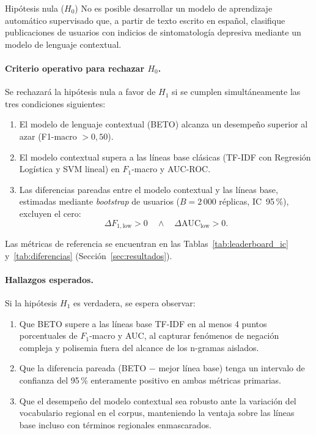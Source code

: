 \documentclass[12pt,a4paper]{article}
\begin{document}
\begin{destacado}{Hipótesis nula ($H_0$)}
No es posible desarrollar un modelo de aprendizaje automático supervisado que, a partir de texto escrito en español, clasifique publicaciones de usuarios con indicios de sintomatología depresiva mediante un modelo de lenguaje contextual.
\end{destacado}

\paragraph{Criterio operativo para rechazar $H_0$.}
Se rechazará la hipótesis nula a favor de $H_1$ si se cumplen simultáneamente las tres condiciones siguientes:
\begin{enumerate}[leftmargin=2em]
    \item El modelo de lenguaje contextual (BETO) alcanza un desempeño superior al azar (F1-macro $> 0{,}50$).
    \item El modelo contextual supera a las líneas base clásicas (TF-IDF con Regresión Logística y SVM lineal) en $F_1$-macro y AUC-ROC.
    \item Las diferencias pareadas entre el modelo contextual y las líneas base, estimadas mediante \emph{bootstrap} de usuarios ($B=2\,000$ réplicas, IC~95\,\%), excluyen el cero:
    \begin{equation}
        \Delta F_{1,\text{low}} > 0 \quad \land \quad \Delta\text{AUC}_{\text{low}} > 0.
    \end{equation}
\end{enumerate}
Las métricas de referencia se encuentran en las Tablas~\ref{tab:leaderboard_ic} y~\ref{tab:diferencias} (Sección~\ref{sec:resultados}).

\paragraph{Hallazgos esperados.}
Si la hipótesis $H_1$ es verdadera, se espera observar:
\begin{enumerate}[leftmargin=2em]
    \item Que BETO supere a las líneas base TF-IDF en al menos 4 puntos porcentuales de $F_1$-macro y AUC, al capturar fenómenos de negación compleja y polisemia fuera del alcance de los n-gramas aislados.
    \item Que la diferencia pareada (BETO $-$ mejor línea base) tenga un intervalo de confianza del 95\,\% enteramente positivo en ambas métricas primarias.
    \item Que el desempeño del modelo contextual sea robusto ante la variación del vocabulario regional en el corpus, manteniendo la ventaja sobre las líneas base incluso con términos regionales enmascarados.
\end{enumerate}
\end{document}
